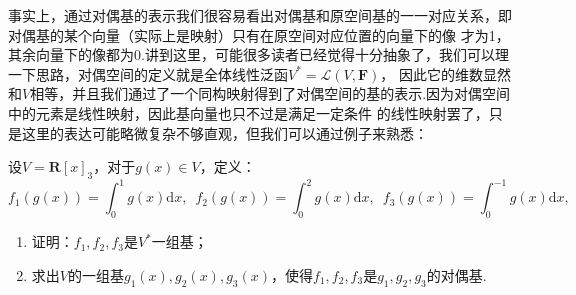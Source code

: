 事实上，通过对偶基的表示我们很容易看出对偶基和原空间基的一一对应关系，即对偶基的某个向量（实际上是映射）只有在原空间对应位置的向量下的像
才为1，其余向量下的像都为0.讲到这里，可能很多读者已经觉得十分抽象了，我们可以理一下思路，对偶空间的定义就是全体线性泛函$V^*=\mathcal{L}(V,\mathbf{F})$，
因此它的维数显然和$V$相等，并且我们通过了一个同构映射得到了对偶空间的基的表示.因为对偶空间中的元素是线性映射，因此基向量也只不过是满足一定条件
的线性映射罢了，只是这里的表达可能略微复杂不够直观，但我们可以通过例子来熟悉：
\begin{example}
    设$V=\mathbf{R}[x]_3$，对于$g(x)\in V$，定义：
    \[f_1(g(x))=\int_0^1g(x)\mathrm{d}x,\enspace f_2(g(x))=\int_0^2g(x)\mathrm{d}x,\enspace f_3(g(x))=\int_0^{-1}g(x)\mathrm{d}x,\]
    \begin{enumerate}[label=(\arabic*)]
        \item 证明：$f_1,f_2,f_3$是$V^*$一组基；
        \item 求出$V$的一组基$g_1(x),g_2(x),g_3(x)$，使得$f_1,f_2,f_3$是$g_1,g_2,g_3$的对偶基.
    \end{enumerate}
\end{example}
\begin{solution}

\end{solution}

